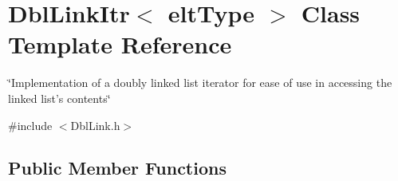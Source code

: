 \hypertarget{classDblLinkItr}{\section{Dbl\-Link\-Itr$<$ elt\-Type $>$ Class Template Reference}
\label{classDblLinkItr}
}


\char`\"{}\-Implementation of a doubly linked list iterator for ease of use in accessing the linked list's contents\char`\"{}  




{\ttfamily \#include $<$Dbl\-Link.\-h$>$}

\subsection*{Public Member Functions}
